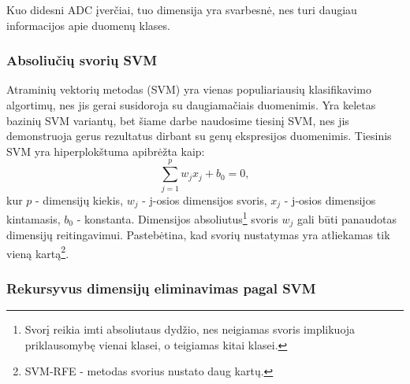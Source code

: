 Kuo didesni ADC įverčiai, tuo dimensija yra svarbesnė, nes turi daugiau
informacijos apie duomenų klases.

\subsubsection{Absoliučių svorių SVM}

Atraminių vektorių metodas (SVM) yra vienas populiariausių klasifikavimo algortimų,
nes jis gerai susidoroja su daugiamačiais duomenimis. Yra keletas bazinių 
SVM variantų, bet šiame darbe naudosime tiesinį SVM, nes jis demonstruoja
gerus rezultatus dirbant su genų ekspresijos duomenimis. Tiesinis SVM yra
hiperplokštuma apibrėžta kaip:
\begin{equation}
 \sum_{j=1}^{p}{w_jx_j + b_0 = 0},
\end{equation}
kur $p$ - dimensijų kiekis, $w_j$ - j-osios dimensijos svoris, $x_j$ - j-osios
dimensijos kintamasis, $b_0$ - konstanta. Dimensijos absoliutus\footnote{Svorį
reikia imti absoliutaus dydžio, nes neigiamas svoris implikuoja priklausomybę 
vienai klasei, o teigiamas kitai klasei.} svoris $w_j$ gali būti panaudotas
dimensijų reitingavimui. Pastebėtina, kad svorių nustatymas yra atliekamas tik 
vieną kartą\footnote{SVM-RFE - metodas svorius nustato daug kartų.}.

\subsubsection{Rekursyvus dimensijų eliminavimas pagal SVM}

